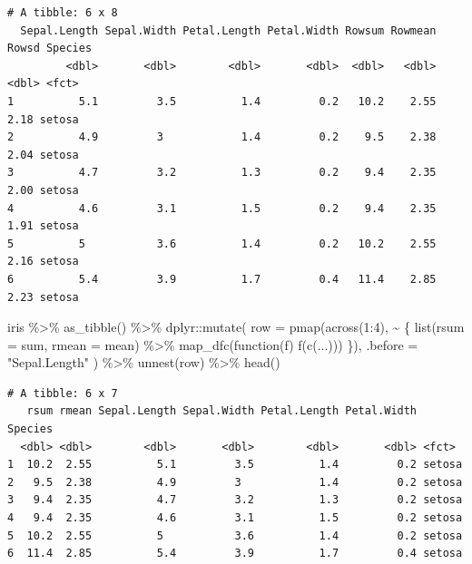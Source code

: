 \documentclass[
  letterpaper,
  DIV=11,
  numbers=noendperiod]{scrartcl}
\newenvironment{Shaded}{}{}
\newcommand{\AttributeTok}[1]{\textcolor[rgb]{0.65,0.15,0.64}{#1}}
\newcommand{\ControlFlowTok}[1]{\textcolor[rgb]{0.65,0.15,0.64}{#1}}
\newcommand{\DecValTok}[1]{\textcolor[rgb]{0.60,0.41,0.00}{#1}}
\newcommand{\FunctionTok}[1]{\textcolor[rgb]{0.25,0.47,0.95}{#1}}
\newcommand{\NormalTok}[1]{\textcolor[rgb]{0.22,0.23,0.26}{#1}}
\newcommand{\SpecialCharTok}[1]{\textcolor[rgb]{0.00,0.52,0.74}{#1}}
\newcommand{\StringTok}[1]{\textcolor[rgb]{0.31,0.63,0.31}{#1}}
\begin{document}
\begin{verbatim}
# A tibble: 6 x 8
  Sepal.Length Sepal.Width Petal.Length Petal.Width Rowsum Rowmean Rowsd Species
         <dbl>       <dbl>        <dbl>       <dbl>  <dbl>   <dbl> <dbl> <fct>  
1          5.1         3.5          1.4         0.2   10.2    2.55  2.18 setosa 
2          4.9         3            1.4         0.2    9.5    2.38  2.04 setosa 
3          4.7         3.2          1.3         0.2    9.4    2.35  2.00 setosa 
4          4.6         3.1          1.5         0.2    9.4    2.35  1.91 setosa 
5          5           3.6          1.4         0.2   10.2    2.55  2.16 setosa 
6          5.4         3.9          1.7         0.4   11.4    2.85  2.23 setosa 
\end{verbatim}

\begin{Shaded}
\begin{Highlighting}[]
\NormalTok{iris }\SpecialCharTok{\%\textgreater{}\%}
  \FunctionTok{as\_tibble}\NormalTok{() }\SpecialCharTok{\%\textgreater{}\%}
\NormalTok{  dplyr}\SpecialCharTok{::}\FunctionTok{mutate}\NormalTok{(}
    \AttributeTok{row =} \FunctionTok{pmap}\NormalTok{(}\FunctionTok{across}\NormalTok{(}\DecValTok{1}\SpecialCharTok{:}\DecValTok{4}\NormalTok{), }\SpecialCharTok{\textasciitilde{}}\NormalTok{ \{}
      \FunctionTok{list}\NormalTok{(}\AttributeTok{rsum =}\NormalTok{ sum, }\AttributeTok{rmean =}\NormalTok{ mean) }\SpecialCharTok{\%\textgreater{}\%}
        \FunctionTok{map\_dfc}\NormalTok{(}\ControlFlowTok{function}\NormalTok{(f) }\FunctionTok{f}\NormalTok{(}\FunctionTok{c}\NormalTok{(...)))}
\NormalTok{    \}),}
    \AttributeTok{.before =} \StringTok{"Sepal.Length"}
\NormalTok{  ) }\SpecialCharTok{\%\textgreater{}\%}
  \FunctionTok{unnest}\NormalTok{(row) }\SpecialCharTok{\%\textgreater{}\%}
  \FunctionTok{head}\NormalTok{()}
\end{Highlighting}
\end{Shaded}

\begin{verbatim}
# A tibble: 6 x 7
   rsum rmean Sepal.Length Sepal.Width Petal.Length Petal.Width Species
  <dbl> <dbl>        <dbl>       <dbl>        <dbl>       <dbl> <fct>  
1  10.2  2.55          5.1         3.5          1.4         0.2 setosa 
2   9.5  2.38          4.9         3            1.4         0.2 setosa 
3   9.4  2.35          4.7         3.2          1.3         0.2 setosa 
4   9.4  2.35          4.6         3.1          1.5         0.2 setosa 
5  10.2  2.55          5           3.6          1.4         0.2 setosa 
6  11.4  2.85          5.4         3.9          1.7         0.4 setosa 
\end{verbatim}
\end{document}

